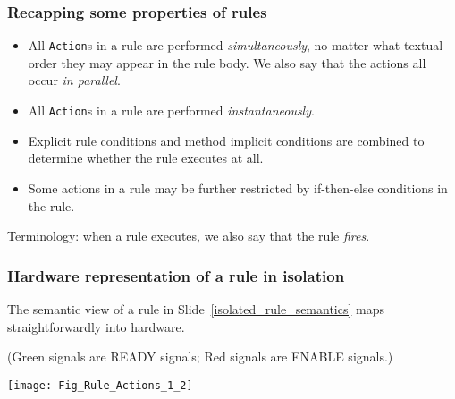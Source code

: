 
\begin{frame}[fragile]
\frametitle{Recapping some properties of rules}

\footnotesize

\begin{itemize}

 \item All {\tt Action}s in a rule are
       performed \emph{simultaneously}, no matter what textual order
       they may appear in the rule body.  We also say that the actions
       all occur \emph{in parallel}.

 \item All {\tt Action}s in a rule are performed
       \emph{instantaneously}.

 \item Explicit rule conditions and method implicit conditions are
       combined to determine whether the rule executes at all.

 \item Some actions in a rule may be further restricted by
       if-then-else conditions in the rule.

\end{itemize}

       
\vspace{5ex}

Terminology: when a rule executes, we also say that the rule \emph{fires}.

\end{frame}


\begin{frame}[fragile]
\frametitle{Hardware representation of a rule in isolation}

\label{Slide_HW_representation_of_a_rule}

\footnotesize

The semantic view of a rule in Slide~\ref{isolated_rule_semantics}
maps straightforwardly into hardware.

\vspace{1ex}

(Green signals are READY signals; Red signals are ENABLE signals.)

\vspace{4ex}

\begin{center}
 \texttt{[image: Fig\_Rule\_Actions\_1\_2]}
\end{center}

\end{frame}

